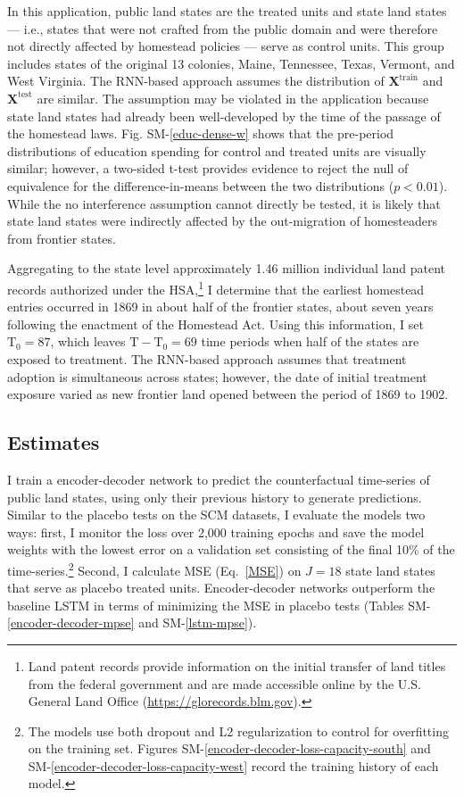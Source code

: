 \documentclass[hidelinks,12pt]{article}
\begin{document}
In this application, public land states are the treated units and state land states --- i.e., states that were not crafted from the public domain and were therefore not directly affected by homestead policies --- serve as control units. This group includes states of the original 13 colonies, Maine, Tennessee, Texas, Vermont, and West Virginia. The RNN-based approach assumes the distribution of $\boldsymbol{X}^{\text{train}}$ and $\boldsymbol{X}^{\text{test}}$ are similar. The assumption may be violated in the application because state land states had already been well-developed by the time of the passage of the homestead laws. Fig. SM-\ref{educ-dense-w} shows that the pre-period distributions of education spending for control and treated units are visually similar; however, a two-sided t-test provides evidence to reject the null of equivalence for the difference-in-means between the two distributions ($p <0.01$). While the no interference assumption cannot directly be tested, it is likely that state land states were indirectly affected by the out-migration of homesteaders from frontier states. %

Aggregating to the state level approximately 1.46 million individual land patent records authorized under the HSA,\footnote{Land patent records provide information on the initial transfer of land titles from the federal government and are made accessible online by the U.S. General Land Office (\url{https://glorecords.blm.gov}).} I determine that the earliest homestead entries occurred in 1869 in about half of the frontier states, about seven years following the enactment of the Homestead Act. Using this information, I set $\text{T}_0 = 87$, which leaves $\text{T} - \text{T}_0 = 69$ time periods when half of the states are exposed to treatment. The RNN-based approach assumes that treatment adoption is simultaneous across states; however, the date of initial treatment exposure varied as new frontier land opened between the period of 1869 to 1902. 

\subsection{Estimates}

I train a encoder-decoder network to predict the counterfactual time-series of public land states, using only their previous history to generate predictions. Similar to the placebo tests on the SCM datasets, I evaluate the models two ways: first, I monitor the loss over 2,000 training epochs and save the model weights with the lowest error on a validation set consisting of the final 10\% of the time-series.\footnote{The models use both dropout and L2 regularization to control for overfitting on the training set. Figures SM-\ref{encoder-decoder-loss-capacity-south} and SM-\ref{encoder-decoder-loss-capacity-west} record the training history of each model.} Second, I calculate MSE (Eq.~\ref{MSE}) on $J=18$ state land states that serve as placebo treated units. Encoder-decoder networks outperform the baseline LSTM in terms of minimizing the MSE in placebo tests (Tables SM-\ref{encoder-decoder-mpse} and SM-\ref{lstm-mpse}).
\end{document}
